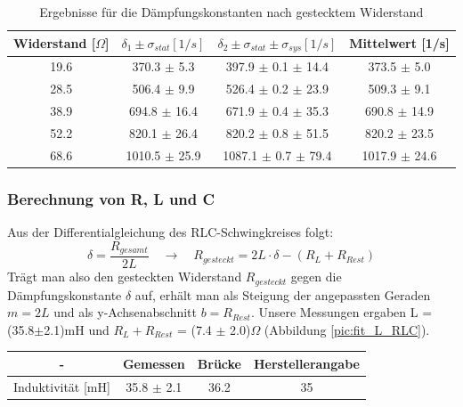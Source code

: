 \documentclass[12pt,a4paper]{article}
\begin{document}
\begin{table}
	\centering
	\begin{tabular}{|c|c|c|c|}
		\hline
		\textbf{Widerstand [$\Omega$]} & \textbf{$\delta_1 \pm \sigma_{stat} [1/s]$} & \textbf{$\delta_2 \pm \sigma_{stat} \pm \sigma_{sys} [1/s]$} & \textbf{Mittelwert [1/s]} \\
		\hline
		19.6 & 370.3 $\pm$ 5.3 & 397.9 $\pm$ 0.1 $\pm$ 14.4 & 373.5 $\pm$ 5.0 \\
		\hline
		28.5 & 506.4 $\pm$ 9.9 & 526.4 $\pm$ 0.2 $\pm$ 23.9 & 509.3 $\pm$ 9.1 \\
		\hline
		38.9 & 694.8 $\pm$ 16.4 & 671.9 $\pm$ 0.4 $\pm$ 35.3 & 690.8 $\pm$ 14.9 \\
		\hline
		52.2 & 820.1 $\pm$ 26.4 & 820.2 $\pm$ 0.8 $\pm$ 51.5 & 820.2 $\pm$ 23.5 \\
		\hline
		68.6 & 1010.5 $\pm$ 25.9 & 1087.1 $\pm$ 0.7 $\pm$ 79.4 & 1017.9 $\pm$ 24.6 \\
		\hline
	\end{tabular}
	\caption{Ergebnisse für die Dämpfungskonstanten nach gestecktem Widerstand}
	\label{tab:delta}
\end{table}


\subsubsection{Berechnung von R, L und C}
Aus der Differentialgleichung des RLC-Schwingkreises folgt:
\begin{equation}
\delta = \frac{R_{gesamt}}{2L} \quad \rightarrow \quad R_{gesteckt} = 2 L \cdot \delta - (R_L + R_{Rest})
\end{equation}
Trägt man also den gesteckten Widerstand $R_{gesteckt}$ gegen die Dämpfungskonstante $\delta$ auf, erhält man als Steigung der angepassten Geraden $m = 2L$ und als y-Achsenabschnitt $b = R_{Rest}$. Unsere Messungen ergaben L = (35.8$\pm$2.1)mH und $R_L + R_{Rest}$ = (7.4 $\pm$ 2.0)$\Omega$ (Abbildung \ref{pic:fit_L_RLC}).

\begin{table}[H]
	\centering
	\begin{tabular}{|c|c|c|c|}
		\hline
		- & \textbf{Gemessen} & \textbf{Brücke} & \textbf{Herstellerangabe} \\
		\hline
		Induktivität [mH] & 35.8 $\pm$ 2.1 & 36.2 & 35 \\
		\hline
	\end{tabular}
\end{table}
\end{document}

